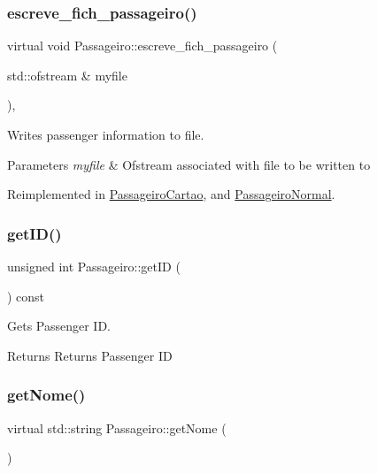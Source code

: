 \subsubsection{\texorpdfstring{escreve\+\_\+fich\+\_\+passageiro()}{escreve\_fich\_passageiro()}}
{\footnotesize\ttfamily virtual void Passageiro\+::escreve\+\_\+fich\+\_\+passageiro (\begin{DoxyParamCaption}\item[{std\+::ofstream \&}]{myfile }\end{DoxyParamCaption})\hspace{0.3cm}{\ttfamily [inline]}, {\ttfamily [virtual]}}



Writes passenger information to file. 


\begin{DoxyParams}{Parameters}
{\em myfile} & Ofstream associated with file to be written to \\
\hline
\end{DoxyParams}


Reimplemented in \hyperlink{class_passageiro_cartao_a3c4167d97a0a71215970d7473f9629c1}{Passageiro\+Cartao}, and \hyperlink{class_passageiro_normal_a86e91d053cc146d645dbc8356ea28d35}{Passageiro\+Normal}.

\mbox{\label{class_passageiro_aaca598f3dba0c8a4457ac2f222e84c81}} 
\subsubsection{\texorpdfstring{get\+I\+D()}{getID()}}
{\footnotesize\ttfamily unsigned int Passageiro\+::get\+ID (\begin{DoxyParamCaption}{ }\end{DoxyParamCaption}) const}



Gets Passenger ID. 

\begin{DoxyReturn}{Returns}
Returns Passenger ID 
\end{DoxyReturn}
\mbox{\label{class_passageiro_a1871c2ce0cc1254ffc665a415ec7a815}} 
\subsubsection{\texorpdfstring{get\+Nome()}{getNome()}}
{\footnotesize\ttfamily virtual std\+::string Passageiro\+::get\+Nome (\begin{DoxyParamCaption}{ }\end{DoxyParamCaption})\hspace{0.3cm}{\ttfamily [pure virtual]}}



